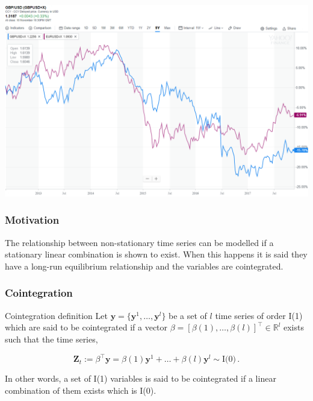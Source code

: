 \documentclass{beamer}
\begin{document}
\begin{frame}
\hspace*{-4mm}
\includegraphics[width=0.9\paperwidth]{img/motivation.png}
\end{frame}


\begin{frame}
\frametitle{Motivation}

The relationship between non-stationary time series can be modelled if a stationary linear combination is shown to exist.
When this happens it is said they have a long-run
equilibrium relationship and the variables are {\color{red} cointegrated}.
\end{frame}

\begin{frame}
\frametitle{Cointegration}
\begin{block}{Cointegration definition}
Let {\color{blue}$\mathbf{y} = \{\mathbf{y}^1, \dots, \mathbf{y}^l\}$} be a set of $l$
time series of order I(1) which are said to be cointegrated if a vector
$\beta=[\beta(1),\dots,\beta(l)]^\top \in \mathbb{R}^l$  exists such that the
time series,

\begin{equation*}
 \mathbf{Z}_t:= \beta^\top \mathbf{y} = \beta(1) \mathbf{y}^1 + \dots + \beta(l) \mathbf{y}^l \sim
 \text{I(0)}\, .
\end{equation*}
\end{block}
In other words, a set of I(1) variables is said to be cointegrated if
a linear combination of them exists which is I(0).

\end{frame}
\end{document}
